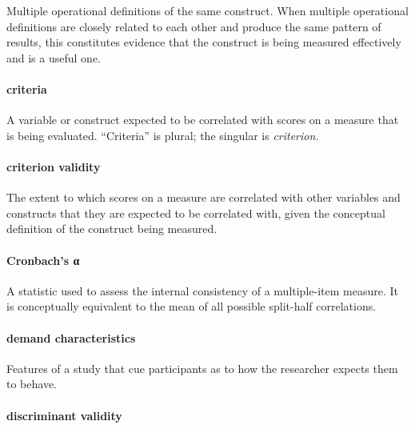 \documentclass[
]{krantz}
\begin{document}
Multiple operational definitions of the same construct. When multiple operational definitions are closely related to each other and produce the same pattern of results, this constitutes evidence that the construct is being measured effectively and is a useful one.

\hypertarget{criteria}{%
\paragraph*{criteria}\label{criteria}}

A variable or construct expected to be correlated with scores on a measure that is being evaluated. ``Criteria'' is plural; the singular is \emph{criterion.}

\hypertarget{criterion-validity-1}{%
\paragraph*{criterion validity}\label{criterion-validity-1}}

The extent to which scores on a measure are correlated with other variables and constructs that they are expected to be correlated with, given the conceptual definition of the construct being measured.

\hypertarget{cronbachs-ux3b1}{%
\paragraph*{Cronbach's α}\label{cronbachs-ux3b1}}

A statistic used to assess the internal consistency of a multiple-item measure. It is conceptually equivalent to the mean of all possible split-half correlations.

\hypertarget{demand-characteristics}{%
\paragraph*{demand characteristics}\label{demand-characteristics}}

Features of a study that cue participants as to how the researcher expects them to behave.

\hypertarget{discriminant-validity-1}{%
\paragraph*{discriminant validity}\label{discriminant-validity-1}}
\end{document}

